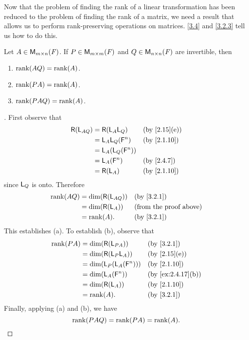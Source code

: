 \begin{note}
  Now that the problem of finding the rank of a linear transformation has been reduced to the problem of finding the rank of a matrix, we need a result that allows us to perform rank-preserving operations on matrices.
  \cref{3.4} and \cref{3.2.3} tell us how to do this.
\end{note}

\begin{thm}\label{3.4}
  Let \(A \in \mathsf{M}_{{m} \times n}({\mathit{F}})\).
  If \(P \in \mathsf{M}_{{m} \times m}({\mathit{F}})\) and \(Q \in \mathsf{M}_{{n} \times n}({\mathit{F}})\) are invertible, then
  \begin{enumerate}
    \item \(\rk{AQ} = \rk{A}\).
    \item \(\rk{PA} = \rk{A}\).
    \item \(\rk{PAQ} = \rk{A}\).
  \end{enumerate}
\end{thm}

\begin{proof}[]
  First observe that
  \begin{align*}
    \rg{\L_{AQ}} & = \rg{\L_A \L_Q}       &  & \text{(by \cref{2.15}(e))} \\
                 & = \L_A \L_Q(\vs{F}^n)  &  & \text{(by \cref{2.1.10})}  \\
                 & = \L_A(\L_Q(\vs{F}^n))                                 \\
                 & = \L_A(\vs{F}^n)       &  & \text{(by \cref{2.4.7})}   \\
                 & = \rg{\L_A}            &  & \text{(by \cref{2.1.10})}
  \end{align*}
  since \(\mathsf{L}_Q\) is onto.
  Therefore
  \begin{align*}
    \rk{AQ} & = \dim(\rg{\L_{AQ}}) &  & \text{(by \cref{3.2.1})}      \\
            & = \dim(\rg{\L_A})    &  & \text{(from the proof above)} \\
            & = \rk{A}.            &  & \text{(by \cref{3.2.1})}
  \end{align*}
  This establishes (a).
  To establish (b), observe that
  \begin{align*}
    \rk{PA} & = \dim(\rg{\L_{PA}})         &  & \text{(by \cref{3.2.1})}        \\
            & = \dim(\rg{\L_P \L_A})       &  & \text{(by \cref{2.15}(e))}      \\
            & = \dim(\L_P(\L_A(\vs{F}^n))) &  & \text{(by \cref{2.1.10})}       \\
            & = \dim(\L_A(\vs{F}^n))       &  & \text{(by \cref{ex:2.4.17}(b))} \\
            & = \dim(\rg{\L_A})            &  & \text{(by \cref{2.1.10})}       \\
            & = \rk{A}.                    &  & \text{(by \cref{3.2.1})}
  \end{align*}
  Finally, applying (a) and (b), we have
  \[
    \rk{PAQ} = \rk{PA} = \rk{A}.
  \]
\end{proof}

